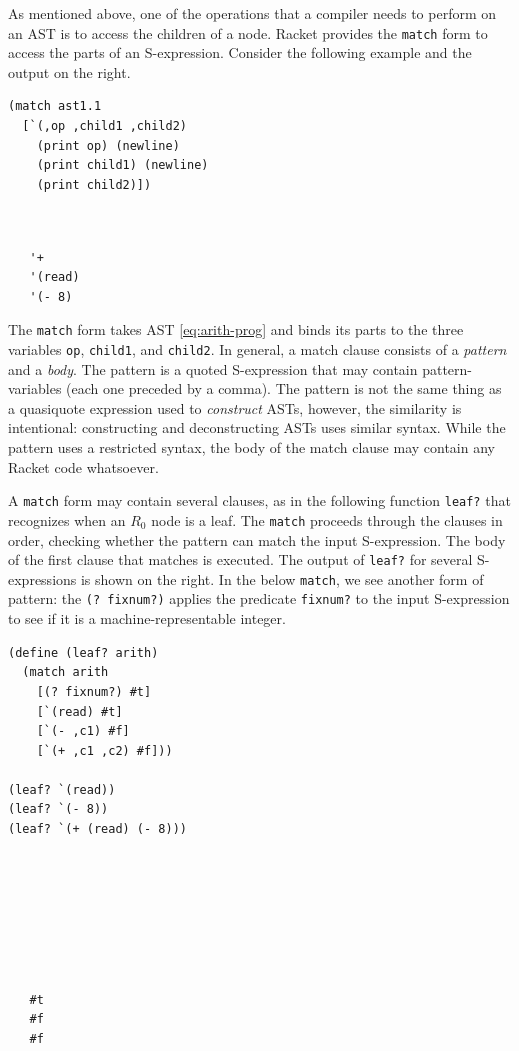 \documentclass[11pt]{book}
\begin{document}
As mentioned above, one of the operations that a compiler needs to
perform on an AST is to access the children of a node.  Racket
provides the \texttt{match} form to access the parts of an
S-expression. Consider the following example and the output on the
right.
\begin{center}
\begin{minipage}{0.5\textwidth}
\begin{lstlisting}
(match ast1.1
  [`(,op ,child1 ,child2)
    (print op) (newline)
    (print child1) (newline)
    (print child2)])
\end{lstlisting}
\end{minipage}
\vrule
\begin{minipage}{0.25\textwidth}
\begin{lstlisting}


   '+
   '(read)
   '(- 8)
\end{lstlisting}
\end{minipage}
\end{center}
The \texttt{match} form takes AST \eqref{eq:arith-prog} and binds its
parts to the three variables \texttt{op}, \texttt{child1}, and
\texttt{child2}. In general, a match clause consists of a
\emph{pattern} and a \emph{body}. The pattern is a quoted S-expression
that may contain pattern-variables (each one preceded by a comma).
%
The pattern is not the same thing as a quasiquote expression used to
\emph{construct} ASTs, however, the similarity is intentional: constructing and
deconstructing ASTs uses similar syntax.
%
While the pattern uses a restricted syntax,
the body of the match clause may contain any Racket code whatsoever.


A \texttt{match} form may contain several clauses, as in the following
function \texttt{leaf?} that recognizes when an $R_0$ node is
a leaf. The \texttt{match} proceeds through the clauses in order,
checking whether the pattern can match the input S-expression. The
body of the first clause that matches is executed. The output of
\texttt{leaf?} for several S-expressions is shown on the right. In the
below \texttt{match}, we see another form of pattern: the \texttt{(?
  fixnum?)} applies the predicate \texttt{fixnum?} to the input
S-expression to see if it is a machine-representable integer.
\begin{center}
\begin{minipage}{0.5\textwidth}
\begin{lstlisting}
(define (leaf? arith)
  (match arith
    [(? fixnum?) #t]
    [`(read) #t]
    [`(- ,c1) #f]
    [`(+ ,c1 ,c2) #f]))

(leaf? `(read))
(leaf? `(- 8))
(leaf? `(+ (read) (- 8)))
\end{lstlisting}
\end{minipage}
\vrule
\begin{minipage}{0.25\textwidth}
  \begin{lstlisting}







   #t
   #f
   #f
\end{lstlisting}
\end{minipage}
\end{center}
\end{document}
